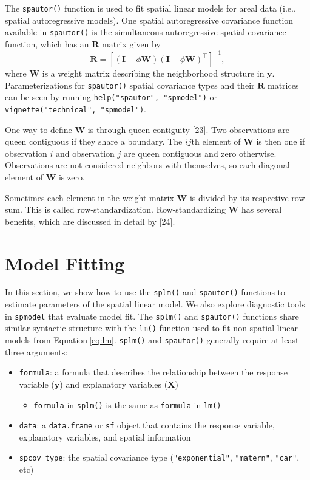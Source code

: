 \documentclass[10pt,letterpaper]{article}
\providecommand{\tightlist}{%
  \setlength{\itemsep}{0pt}\setlength{\parskip}{0pt}}
\begin{document}
The \texttt{spautor()} function is used to fit spatial linear models for
areal data (i.e., spatial autoregressive models). One spatial
autoregressive covariance function available in \texttt{spautor()} is
the simultaneous autoregressive spatial covariance function, which has
an \(\mathbf{R}\) matrix given by \begin{equation*}
  \mathbf{R} = [(\mathbf{I} - \phi \mathbf{W})(\mathbf{I} - \phi \mathbf{W})^\top]^{-1},
\end{equation*} where \(\mathbf{W}\) is a weight matrix describing the
neighborhood structure in \(\mathbf{y}\). Parameterizations for
\texttt{spautor()} spatial covariance types and their \(\mathbf{R}\)
matrices can be seen by running \texttt{help("spautor",\ "spmodel")} or
\texttt{vignette("technical",\ "spmodel")}.

One way to define \(\mathbf{W}\) is through queen contiguity {[}23{]}.
Two observations are queen contiguous if they share a boundary. The
\(ij\)th element of \(\mathbf{W}\) is then one if observation \(i\) and
observation \(j\) are queen contiguous and zero otherwise. Observations
are not considered neighbors with themselves, so each diagonal element
of \(\mathbf{W}\) is zero.

Sometimes each element in the weight matrix \(\mathbf{W}\) is divided by
its respective row sum. This is called row-standardization.
Row-standardizing \(\mathbf{W}\) has several benefits, which are
discussed in detail by {[}24{]}.

\hypertarget{sec:modelfit}{%
\section{Model Fitting}\label{sec:modelfit}}

In this section, we show how to use the \texttt{splm()} and
\texttt{spautor()} functions to estimate parameters of the spatial
linear model. We also explore diagnostic tools in \texttt{spmodel} that
evaluate model fit. The \texttt{splm()} and \texttt{spautor()} functions
share similar syntactic structure with the \texttt{lm()} function used
to fit non-spatial linear models from Equation\(~\)\ref{eq:lm}.
\texttt{splm()} and \texttt{spautor()} generally require at least three
arguments:

\begin{itemize}
\tightlist
\item
  \texttt{formula}: a formula that describes the relationship between
  the response variable (\(\mathbf{y}\)) and explanatory variables
  (\(\mathbf{X}\))

  \begin{itemize}
  \tightlist
  \item
    \texttt{formula} in \texttt{splm()} is the same as \texttt{formula}
    in \texttt{lm()}
  \end{itemize}
\item
  \texttt{data}: a \texttt{data.frame} or \texttt{sf} object that
  contains the response variable, explanatory variables, and spatial
  information
\item
  \texttt{spcov\_type}: the spatial covariance type
  (\texttt{"exponential"}, \texttt{"matern"}, \texttt{"car"}, etc)
\end{itemize}
\end{document}
